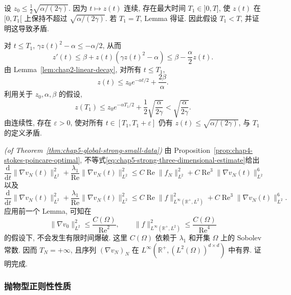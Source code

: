 \begin{Proof}
设 $z_0\leq\frac12\sqrt{\alpha/(2\gamma)}$. 因为 $t\mapsto z(t)$ 连续, 存在最大时间 $T_1\in]0,T]$, 使 $z(t)$ 在 $[0,T_1[$ 上保持不超过 $\sqrt{\alpha/(2\gamma)}$. 若 $T_1=T$, Lemma 得证. 因此假设 $T_1<T$, 并证明这导致矛盾.

对 $t\leq T_1$, $\gamma z(t)^2-\alpha\leq-\alpha/2$, 从而
\[
 z'(t)\leq\beta+z(t)(\gamma z(t)^2-\alpha)
 \leq\beta-\frac\alpha2z(t).
\]
由 Lemma~\ref{lem:chap2-linear-decay}, 对所有 $t\leq T_1$,
\[
 z(t)\leq z_0e^{-\alpha t/2}+\frac{2\beta}\alpha.
\]
利用关于 $z_0,\alpha,\beta$ 的假设,
\[
 z(T_1)\leq z_0e^{-\alpha T_1/2}+\frac12\sqrt{\frac\alpha{2\gamma}}
 <\sqrt{\frac\alpha{2\gamma}}.
\]
由连续性, 存在 $\varepsilon>0$, 使对所有 $t\in[T_1,T_1+\varepsilon]$ 仍有 $z(t)\leq\sqrt{\alpha/(2\gamma)}$, 与 $T_1$ 的定义矛盾.
\end{Proof}

\begin{Proof}
\textit{(of Theorem~\ref{thm:chap5-global-strong-small-data})}\quad
由 Proposition~\ref{prop:chap4-stokes-poincare-optimal}, 不等式\eqref{eq:chap5-strong-three-dimensional-estimate}给出
\[
 \frac{\mathrm d}{\mathrm dt}\|\nabla v_N(t)\|_{L^2}^2
 +\frac{\lambda_1}{\operatorname{Re}}\|\nabla v_N(t)\|_{L^2}^2
 \leq C\operatorname{Re}\|f_N\|_{L^2}^2
 +C\operatorname{Re}^3\|\nabla v_N(t)\|_{L^2}^6
\]
以及
\[
 \frac{\mathrm d}{\mathrm dt}\|\nabla v_N(t)\|_{L^2}^2
 +\frac{\lambda_1}{\operatorname{Re}}\|\nabla v_N(t)\|_{L^2}^2
 \leq C\operatorname{Re}\|f\|_{L^\infty(\mathbb R^+,L^2)}^2
 +C\operatorname{Re}^3\|\nabla v_N(t)\|_{L^2}^6.
\]
应用前一个 Lemma, 可知在
\[
 \|\nabla v_0\|_{L^2}^2\leq\frac{C(\Omega)}{\operatorname{Re}^2},
 \qquad
 \|f\|_{L^\infty(\mathbb R^+,L^2)}^2\leq\frac{C(\Omega)}{\operatorname{Re}^4}
\]
的假设下, 不会发生有限时间爆破. 这里 $C(\Omega)$ 依赖于 $\lambda_1$ 和开集 $\Omega$ 上的 Sobolev 常数. 因而 $T_N=+\infty$, 且序列 $(\nabla v_N)_N$ 在 $L^\infty(\mathbb R^+,(L^2(\Omega))^{d\times d})$ 中有界. 证明完成.
\end{Proof}

\subsubsection{抛物型正则性性质}
\label{subsec:chap5-parabolic-regularity}

